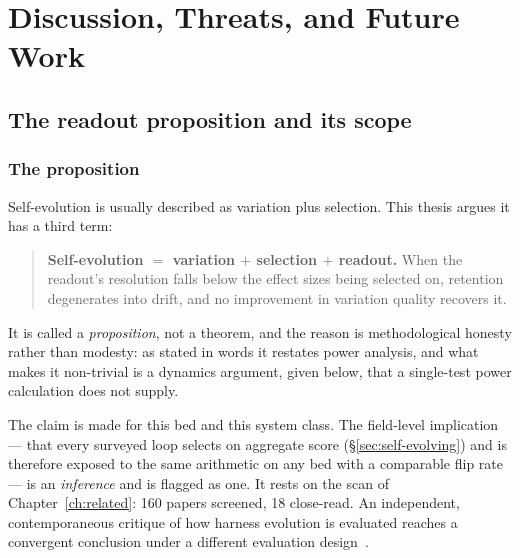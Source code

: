 \chapter{Discussion, Threats, and Future Work}
\label{ch:discussion}


\section{The readout proposition and its scope}
\label{sec:proposition}

\subsection*{The proposition}

Self-evolution is usually described as variation plus selection. This
thesis argues it has a third term:

\begin{quote}
\textbf{Self-evolution $=$ variation $+$ selection $+$ readout.} When the
readout's resolution falls below the effect sizes being selected on,
retention degenerates into drift, and no improvement in variation quality
recovers it.
\end{quote}

It is called a \emph{proposition}, not a theorem, and the reason is
methodological honesty rather than modesty: as stated in words it restates
power analysis, and what makes it non-trivial is a dynamics argument, given
below, that a single-test power calculation does not supply.

The claim is made for this bed and this system class. The field-level
implication --- that every surveyed loop selects on aggregate score
(\S\ref{sec:self-evolving}) and is therefore exposed to the same
arithmetic on any bed with a comparable flip rate --- is an \emph{inference}
and is flagged as one. It rests on the scan of Chapter~\ref{ch:related}:
160 papers screened, 18 close-read. An independent, contemporaneous
critique of how harness evolution is evaluated reaches a convergent
conclusion under a different evaluation design~\cite{rethink-harness-eval}.

